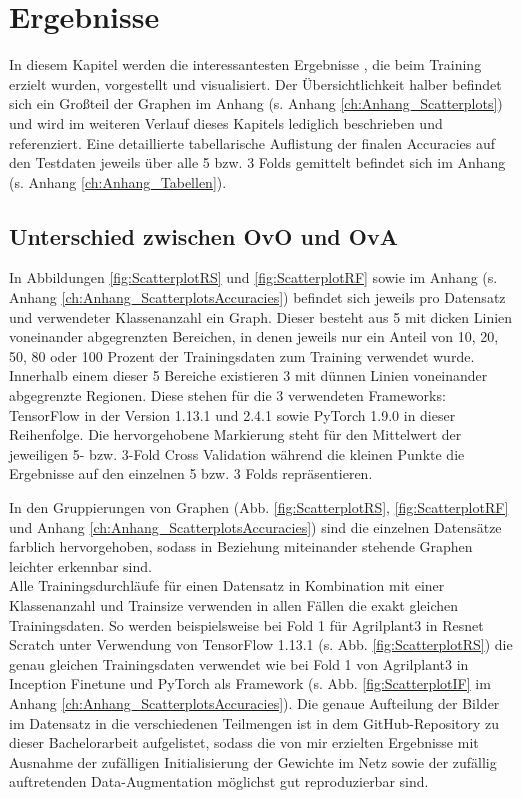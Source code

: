 \chapter{Ergebnisse}
\label{ch:ergebnisse}
In diesem Kapitel werden die interessantesten Ergebnisse \cite{githubRepo}, die beim Training erzielt wurden, vorgestellt und visualisiert. Der Übersichtlichkeit halber befindet sich ein Großteil der Graphen im Anhang (s. Anhang \ref{ch:Anhang_Scatterplots}) und wird im weiteren Verlauf dieses Kapitels lediglich beschrieben und referenziert.
Eine detaillierte tabellarische Auflistung der finalen Accuracies auf den Testdaten jeweils über alle 5 bzw. 3 Folds gemittelt befindet sich im Anhang (s. Anhang \ref{ch:Anhang_Tabellen}).

\section{Unterschied zwischen OvO und OvA}
\label{ch:ergebnisseOvOOvA}
In Abbildungen \ref{fig:ScatterplotRS} und \ref{fig:ScatterplotRF} sowie im Anhang (s. Anhang \ref{ch:Anhang_ScatterplotsAccuracies}) befindet sich jeweils pro Datensatz und verwendeter Klassenanzahl ein Graph. Dieser besteht aus 5 mit dicken Linien voneinander abgegrenzten Bereichen, in denen jeweils nur ein Anteil von 10, 20, 50, 80 oder 100 Prozent der Trainingsdaten zum Training verwendet wurde. Innerhalb einem dieser 5 Bereiche existieren 3 mit dünnen Linien voneinander abgegrenzte Regionen. Diese stehen für die 3 verwendeten Frameworks: TensorFlow \cite{tensorflow} in der Version 1.13.1 und 2.4.1 sowie PyTorch \cite{pytorch} 1.9.0 in dieser Reihenfolge. Die hervorgehobene Markierung steht für den Mittelwert der jeweiligen 5- bzw. 3-Fold Cross Validation während die kleinen Punkte die Ergebnisse auf den einzelnen 5 bzw. 3 Folds repräsentieren.

In den Gruppierungen von Graphen (Abb. \ref{fig:ScatterplotRS}, \ref{fig:ScatterplotRF} und Anhang \ref{ch:Anhang_ScatterplotsAccuracies}) sind die einzelnen Datensätze farblich hervorgehoben, sodass in Beziehung miteinander stehende Graphen leichter erkennbar sind.\\

Alle Trainingsdurchläufe für einen Datensatz in Kombination mit einer Klassenanzahl und Trainsize verwenden in allen Fällen die exakt gleichen Trainingsdaten. So werden beispielsweise bei Fold 1 für Agrilplant3 in Resnet Scratch unter Verwendung von TensorFlow \cite{tensorflow} 1.13.1 (s. Abb. \ref{fig:ScatterplotRS}) die genau gleichen Trainingsdaten verwendet wie bei Fold 1 von Agrilplant3 in Inception Finetune und PyTorch \cite{pytorch} als Framework (s. Abb. \ref{fig:ScatterplotIF} im Anhang \ref{ch:Anhang_ScatterplotsAccuracies}). Die genaue Aufteilung der Bilder im Datensatz in die verschiedenen Teilmengen ist in dem GitHub-Repository zu dieser Bachelorarbeit \cite{githubRepo} aufgelistet, sodass die von mir erzielten Ergebnisse mit Ausnahme der zufälligen Initialisierung der Gewichte im Netz sowie der zufällig auftretenden Data-Augmentation möglichst gut reproduzierbar sind.\\

